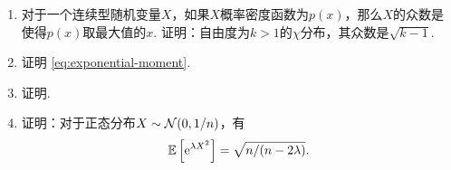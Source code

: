 \begin{enumerate}[wide,labelindent=0pt]
    \item \label{exercise:chi-mode} 对于一个连续型随机变量$X$，如果$X$概率密度函数为$p(x)$，那么$X$的众数是使得$p(x)$取最大值的$x$. 证明：自由度为$k>1$的$\chi$分布，其众数是$\sqrt{k-1}$. 
    
    \item \label{exercise:expoential-moment} 证明 \eqref{eq:exponential-moment}. 
    
    \item \label{exercise:hoeffding-inequality-general} 证明. 
    
    \item \label{exercise:moment-of-gaussian} 证明：对于正态分布$X\sim\mathcal{N}(0,1/n)$，有
    \[\mathbb{E}\left[\mathrm{e}^{\lambda X^2}\right]=\sqrt{n/(n-2\lambda)}.\] 
\end{enumerate}